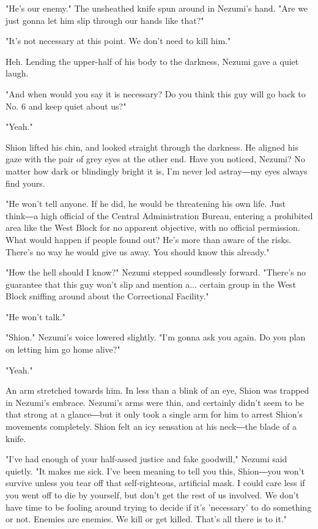 "He's our enemy." The unsheathed knife spun around in Nezumi's hand.
"Are we just gonna let him slip through our hands like that?"

"It's not necessary at this point. We don't need to kill him."

Heh. Lending the upper-half of his body to the darkness, Nezumi gave a
quiet laugh.

"And when would you say it is necessary? Do you think this guy will go
back to No. 6 and keep quiet about us?"

"Yeah."

Shion lifted his chin, and looked straight through the darkness. He
aligned his gaze with the pair of grey eyes at the other end. Have you
noticed, Nezumi? No matter how dark or blindingly bright it is, I'm
never led astray―my eyes always find yours.

"He won't tell anyone. If he did, he would be threatening his own life.
Just think―a high official of the Central Administration Bureau,
entering a prohibited area like the West Block for no apparent
objective, with no official permission. What would happen if people
found out? He's more than aware of the risks. There's no way he would
give us away. You should know this already."

"How the hell should I know?" Nezumi stepped soundlessly forward.
"There's no guarantee that this guy won't slip and mention a... certain
group in the West Block sniffing around about the Correctional
Facility."

"He won't talk."

"Shion." Nezumi's voice lowered slightly. "I'm gonna ask you again. Do
you plan on letting him go home alive?"

"Yeah."

An arm stretched towards him. In less than a blink of an eye, Shion was
trapped in Nezumi's embrace. Nezumi's arms were thin, and certainly
didn't seem to be that strong at a glance―but it only took a single arm
for him to arrest Shion's movements completely. Shion felt an icy
sensation at his neck―the blade of a knife.

"I've had enough of your half-assed justice and fake goodwill," Nezumi
said quietly. "It makes me sick. I've been meaning to tell you this,
Shion―you won't survive unless you tear off that self-righteous,
artificial mask. I could care less if you went off to die by yourself,
but don't get the rest of us involved. We don't have time to be fooling
around trying to decide if it's 'necessary' to do something or not.
Enemies are enemies. We kill or get killed. That's all there is to it."

